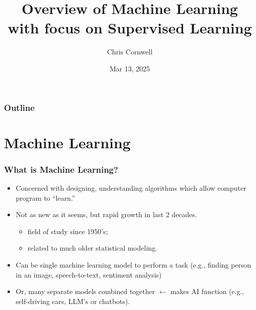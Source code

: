 \documentclass{beamer}
\author{Chris Cornwell}
\date{Mar 13, 2025}
\title{Overview of Machine Learning \newline 
    \footnotesize{with focus on Supervised Learning}}
\theoremstyle{example}
\begin{document}
\begin{frame}
\titlepage
\end{frame}

\begin{frame}
\frametitle{Outline}
\tableofcontents
\end{frame}

\section{Machine Learning}

\begin{frame}
\frametitle{What is Machine Learning?}
    \begin{itemize}
        \item Concerned with designing, understanding algorithms which allow computer program to ``learn.''
        \pause
        \item Not as new as it seems, but rapid growth in last 2 decades. 
        \begin{itemize}
            \item field of study since 1950's; 
            \item related to much older statistical modeling.
        \end{itemize}
        \pause
        \item Can be single machine learning model to perform a task (e.g., finding person in an image, speech-to-text, sentiment analysis)
        \pause
        \item Or, many separate models combined together $\leftarrow$ makes AI function (e.g., self-driving cars, LLM's or chatbots).
    \end{itemize}
\end{frame}
\end{document}
